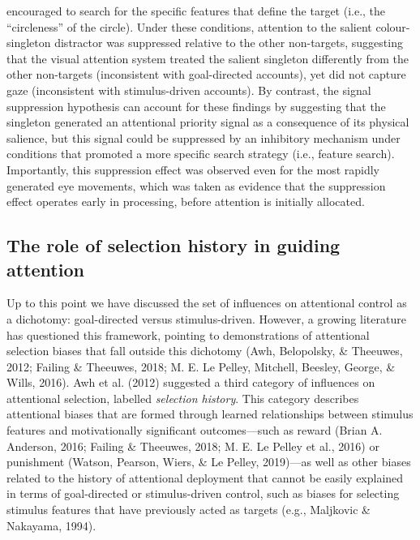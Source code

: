 \documentclass[jou, a4paper, noextraspace,floatsintext]{apa6}
\theoremstyle{definition}
\theoremstyle{definition}
\theoremstyle{definition}
\theoremstyle{remark}
\begin{document}
encouraged to search for the specific features that define the target
(i.e., the \enquote{circleness} of the circle). Under these conditions,
attention to the salient colour-singleton distractor was suppressed
relative to the other non-targets, suggesting that the visual attention
system treated the salient singleton differently from the other
non-targets (inconsistent with goal-directed accounts), yet did not
capture gaze (inconsistent with stimulus-driven accounts). By contrast,
the signal suppression hypothesis can account for these findings by
suggesting that the singleton generated an attentional priority signal
as a consequence of its physical salience, but this signal could be
suppressed by an inhibitory mechanism under conditions that promoted a
more specific search strategy (i.e., feature search). Importantly, this
suppression effect was observed even for the most rapidly generated eye
movements, which was taken as evidence that the suppression effect
operates early in processing, before attention is initially allocated.

\subsection{The role of selection history in guiding
attention}\label{the-role-of-selection-history-in-guiding-attention}

Up to this point we have discussed the set of influences on attentional
control as a dichotomy: goal-directed versus stimulus-driven. However, a
growing literature has questioned this framework, pointing to
demonstrations of attentional selection biases that fall outside this
dichotomy (Awh, Belopolsky, \& Theeuwes, 2012; Failing \& Theeuwes,
2018; M. E. Le Pelley, Mitchell, Beesley, George, \& Wills, 2016). Awh
et al. (2012) suggested a third category of influences on attentional
selection, labelled \emph{selection history}. This category describes
attentional biases that are formed through learned relationships between
stimulus features and motivationally significant outcomes---such as
reward (Brian A. Anderson, 2016; Failing \& Theeuwes, 2018; M. E. Le
Pelley et al., 2016) or punishment (Watson, Pearson, Wiers, \& Le
Pelley, 2019)---as well as other biases related to the history of
attentional deployment that cannot be easily explained in terms of
goal-directed or stimulus-driven control, such as biases for selecting
stimulus features that have previously acted as targets (e.g., Maljkovic
\& Nakayama, 1994).
\end{document}
